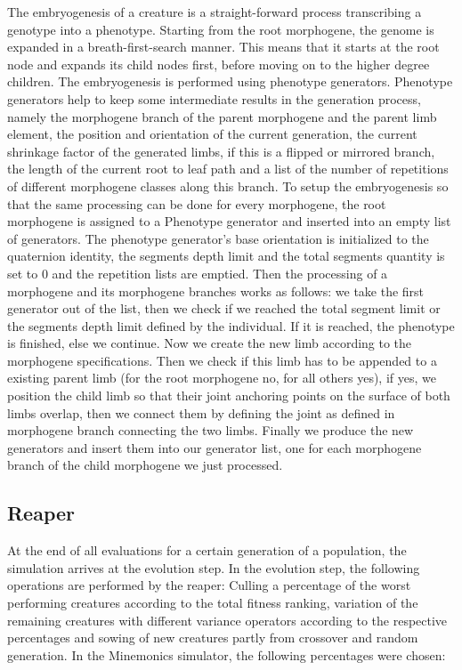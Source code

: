 \documentclass[main]{subfiles}
\begin{document}
The embryogenesis of a creature is a straight-forward process transcribing a genotype into a phenotype. Starting from the root morphogene, the genome is expanded in a breath-first-search manner. This means that it starts at the root node and expands its child nodes first, before moving on to the higher degree children. The embryogenesis is performed using phenotype generators. Phenotype generators help to keep some intermediate results in the generation process, namely the morphogene branch of the parent morphogene and the parent limb element, the position and orientation of the current generation, the current shrinkage factor of the generated limbs, if this is a flipped or mirrored branch, the length of the current root to leaf path and a list of the number of repetitions of different morphogene classes along this branch.  To setup the embryogenesis so that the same processing can be done for every morphogene, the root morphogene is assigned to a Phenotype generator and inserted into an empty list of generators. The phenotype generator's base orientation is initialized to the quaternion identity, the segments depth limit and the total segments quantity is set to 0 and the repetition lists are emptied. Then the processing of a morphogene and its morphogene branches works as follows: we take the first generator out of the list, then we check if we reached the total segment limit or the segments depth limit defined by the individual. If it is reached, the phenotype is finished, else we continue. Now we create the new limb according to the morphogene specifications. Then we check if this limb has to be appended to a existing parent limb (for the root morphogene no, for all others yes), if yes, we position the child limb so that their joint anchoring points on the surface of both limbs overlap, then we connect them by defining the joint as defined in morphogene branch connecting the two limbs. Finally we produce the new generators and insert them into our generator list, one for each morphogene branch of the child morphogene we just processed. 

\subsection{Reaper}
\label{subsection:Reaper}

At the end of all evaluations for a certain generation of a population, the simulation arrives at the evolution step.  In the evolution step, the following operations are performed by the reaper: Culling a percentage of the worst performing creatures according to the total fitness ranking, variation of the remaining creatures with different variance operators according to the respective percentages and sowing of new creatures partly from crossover and random generation. In the Minemonics simulator, the following percentages were chosen:
\end{document}
